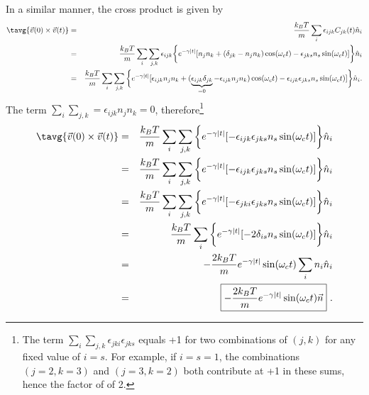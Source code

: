 In a similar manner, the cross product is given by
\begin{eqnarray}
\tavg{\vec{v}(0) \times \vec{v}(t)} &=& \frac{k_B T}{m} \sum_{i} \epsilon_{ijk} C_{jk}(t) \hat{n}_i \nonumber \\
&=& \frac{k_B T}{m} \sum_{i} \sum_{j, k} \epsilon_{ijk} \bigg\{ e^{-\gamma |t|} [ n_j n_k + (\delta_{jk} - n_j n_k) \cos(\omega_c t) - \epsilon_{jks} n_s \sin(\omega_c t)]\bigg\} \hat{n}_i \nonumber \\
&=& \frac{k_B T}{m} \sum_{i} \sum_{j, k} \bigg\{ e^{-\gamma |t|} [ \epsilon_{ijk} n_j n_k + (\underbrace{\epsilon_{ijk} \delta_{jk}}_{=0} -\epsilon_{ijk} n_j n_k) \cos(\omega_c t) - \epsilon_{ijk} \epsilon_{jks} n_s \sin(\omega_c t)]\bigg\}\hat{n}_i \nonumber.
\end{eqnarray}
The term $\sum_{i} \sum_{j, k} = \epsilon_{ijk} n_j n_k = 0$, therefore\footnote{The term $\sum_{i} \sum_{j, k} \epsilon_{jki} \epsilon_{jks}$ equals +1 for two combinations of $(j, k)$ for any fixed value of $i=s$. For example, if $i=s=1$, the combinations $(j=2, k=3)$ and $(j=3, k=2)$ both contribute at +1 in these sums, hence the factor of of 2. }
\begin{eqnarray}
\tavg{\vec{v}(0) \times \vec{v}(t)} &=& \frac{k_B T}{m} \sum_{i} \sum_{j, k} \bigg\{ e^{-\gamma |t|} [-\epsilon_{ijk} \epsilon_{jks} n_s \sin(\omega_c t)]\bigg\}\hat{n}_i \nonumber \\
&=& \frac{k_B T}{m} \sum_{i} \sum_{j, k} \bigg\{ e^{-\gamma |t|} [-\epsilon_{ijk} \epsilon_{jks} n_s \sin(\omega_c t)]\bigg\}\hat{n}_i \\
&=& \frac{k_B T}{m} \sum_{i} \sum_{j, k} \bigg\{ e^{-\gamma |t|} [-\epsilon_{jki} \epsilon_{jks} n_s \sin(\omega_c t)]\bigg\}\hat{n}_i \nonumber \\
&=& \frac{k_B T}{m} \sum_{i}\bigg\{ e^{-\gamma |t|} [-2 \delta_{is} n_s \sin(\omega_c t)]\bigg\}\hat{n}_i \nonumber \\
&=& -\frac{2k_B T}{m} e^{-\gamma |t|} \sin(\omega_c t) \sum_{i} n_i \hat{n}_i \nonumber \\
&=& \boxed{-\frac{2k_B T}{m} e^{-\gamma |t|}\sin(\omega_c t) \vec{n}}~.
\end{eqnarray}

